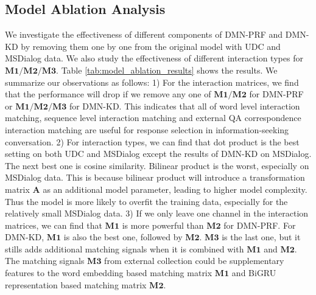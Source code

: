 \subsection{Model Ablation Analysis}
We investigate the effectiveness of different components of DMN-PRF and DMN-KD by removing them one by one from the original model with UDC and MSDialog data. We also study the effectiveness of different interaction types for $\mathbf{M1}/\mathbf{M2}/\mathbf{M3}$. Table \ref{tab:model_ablation_results} shows the results. We summarize our observations as follows: 1) For the interaction matrices, we find that the performance will drop if we remove any one of $\mathbf{M1}/\mathbf{M2}$ for DMN-PRF or $\mathbf{M1}/\mathbf{M2}/\mathbf{M3}$ for DMN-KD. This indicates that all of word level interaction matching, sequence level interaction matching and external QA correspondence interaction matching are useful for response selection in information-seeking conversation. 2) For interaction types, we can find that dot product is the best setting on both UDC and MSDialog except the results of DMN-KD on MSDialog. The next best one is cosine similarity. Bilinear product is the worst, especially on MSDialog data. This is because bilinear product will introduce a transformation matrix $\mathbf{A}$ as an additional model parameter, leading to higher model complexity. Thus the model is more likely to overfit the training data, especially for the relatively small MSDialog data. 3) If we only leave one channel in the interaction matrices, we can find that $\mathbf{M1}$ is more powerful than $\mathbf{M2}$ for DMN-PRF. For DMN-KD, $\mathbf{M1}$ is also the best one, followed by $\mathbf{M2}$. $\mathbf{M3}$ is the last one, but it stills adds additional matching signals when it is combined with $\mathbf{M1}$ and $\mathbf{M2}$. The matching signals $\mathbf{M3}$ from external collection could be supplementary features to the word embedding based matching matrix $\mathbf{M1}$ and BiGRU representation based matching matrix  $\mathbf{M2}$.


